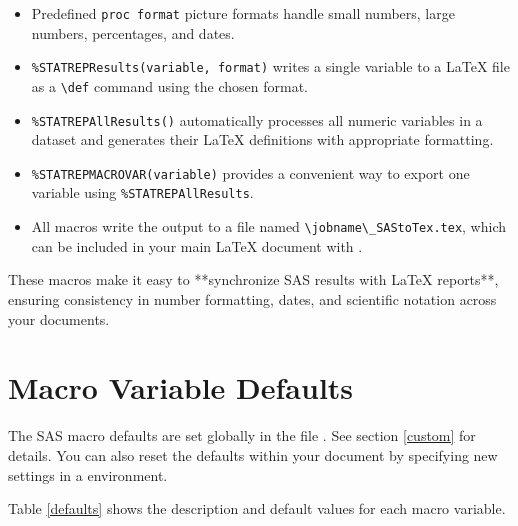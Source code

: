 \documentclass[article,oneside]{memoir}
\begin{document}
\begin{itemize}
	\item Predefined \texttt{proc format} picture formats handle small numbers, large numbers, percentages, and dates.
	\item \texttt{\%STATREPResults(variable, format)} writes a single variable to a \LaTeX{} file as a \verb|\def| command using the chosen format.
	\item \texttt{\%STATREPAllResults()} automatically processes all numeric variables in a dataset and generates their \LaTeX{} definitions with appropriate formatting.
	\item \texttt{\%STATREPMACROVAR(variable)} provides a convenient way to export one variable using \texttt{\%STATREPAllResults}.
  \item All macros write the output to a file named \verb|\jobname\_SAStoTex.tex|, which can be included in your main \LaTeX{} document with \verb||.
\end{itemize}

These macros make it easy to **synchronize SAS results with \LaTeX{} reports**, ensuring consistency in number formatting, dates, and scientific notation across your documents.

  \section{Macro Variable Defaults}\label{secdefaults}

  The SAS macro defaults are set globally in the file .
  See section \ref{custom} for details. You can also reset the
  defaults within your document by specifying new settings in a 
  environment.

  Table \ref{defaults} shows the description and default values for each
  macro variable.
\end{document}
